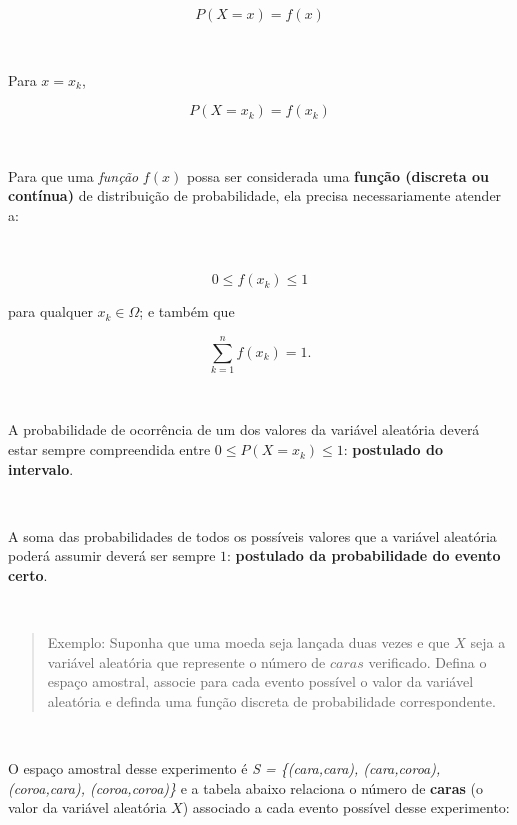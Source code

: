 \documentclass[
]{book}
\begin{document}
\hfill\break
\[
P (X=x) = f(x)
\]

~

Para \(x = x_{k}\),

\[
P (X=x_{k}) = f(x_{k})
\]

~

Para que uma \emph{função} \(f(x)\) possa ser considerada uma \textbf{função (discreta ou contínua)} de distribuição de probabilidade, ela precisa necessariamente atender a:

~

\[
0 \leq f(x_{k}) \leq 1
\]

para qualquer \(x_{k} \in \Omega\); e também que

\[
\sum _{k=1}^{n}f\left(x_{k}\right) = 1.
\]

~

A probabilidade de ocorrência de um dos valores da variável aleatória deverá estar sempre compreendida entre \(0 \leq P(X = x_{k}) \leq 1\): \textbf{postulado do intervalo}.

~

A soma das probabilidades de todos os possíveis valores que a variável aleatória poderá assumir deverá ser sempre \(1\): \textbf{postulado da probabilidade do evento certo}.

~

\begin{quote}
Exemplo: Suponha que uma moeda seja lançada duas vezes e que \(X\) seja a variável aleatória que represente o número de \(caras\) verificado. Defina o espaço amostral, associe para cada evento possível o valor da variável aleatória e definda uma função discreta de probabilidade correspondente.
\end{quote}

~

O espaço amostral desse experimento é \emph{S = \{(cara,cara), (cara,coroa), (coroa,cara), (coroa,coroa)\}} e a tabela abaixo relaciona o número de \textbf{caras} (o valor da variável aleatória \(X\)) associado a cada evento possível desse experimento:

~

\begin{table}[]
\end{table}
\end{document}
